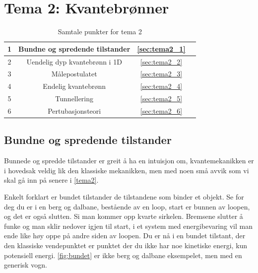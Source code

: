 \section{Tema 2: Kvantebrønner}
\label{tema2}

\begin{table}[!htb]
    \centering
    \caption{Samtale punkter for tema 2}
    \begin{tabular}{|c|c|c|r|}
      \hline
      1 & Bundne og spredende tilstander &  \autoref{sec:tema2_1} & \cellcolor{blue}\quad\quad \\
      \hline 
      2 & Uendelig dyp kvantebrønn i 1D & \autoref{sec:tema2_2} & \cellcolor{green} \\
      \hline
      3 & Målepostulatet & \autoref{sec:tema2_3} & \cellcolor{green} \\
      \hline
      4 & Endelig kvantebrønn & \autoref{sec:tema2_4} & \cellcolor{blue} \\
      \hline 
      5 & Tunnellering & \autoref{sec:tema2_5} & \cellcolor{green} \\
      \hline
      6 & Pertubasjonsteori & \autoref{sec:tema2_6} & \cellcolor{green} \\ 
      \hline
    \end{tabular}
    \label{tab:samtalePunkt_tema1}
\end{table}

\subsection{Bundne og spredende tilstander}
\label{sec:tema2_1}
Bunnede og spredde tilstander er greit å ha en intuisjon om, kvantemekanikken er i hovedsak veldig lik den klassiske mekanikken, men med noen små avvik som vi skal gå inn på senere i \autoref{tema2}.

Enkelt forklart er bundet tilstander de tilstandene som binder et objekt. Se for deg du er i en berg og dalbane, bestående av en loop, start er bunnen av loopen, og det er også slutten. Si man kommer opp kvarte sirkelen. Bremsene slutter å funke og man sklir nedover igjen til start, i et system med energibevaring vil man ende like høy oppe på andre siden av loopen. Du er nå i en bundet tilstant, der den klassiske vendepunktet er punktet der du ikke har noe kinetiske energi, kun potensiell energi. \autoref{fig:bundet} er ikke berg og dalbane eksempelet, men med en generisk vogn.

